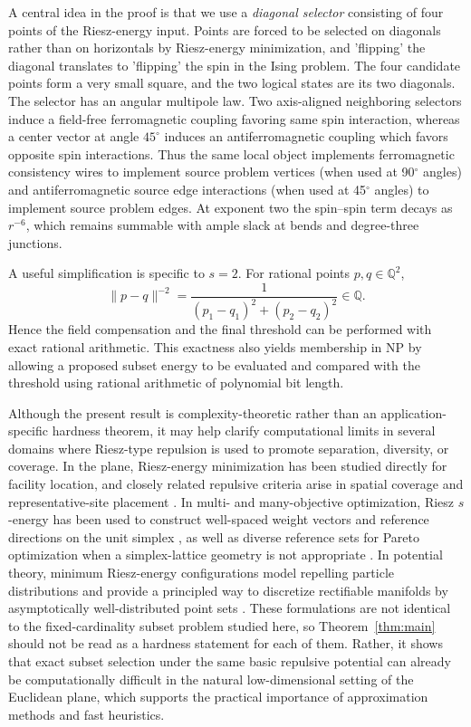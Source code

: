 \documentclass[12pt,a4paper]{article}
\newcommand{\Q}{\mathbb{Q}}
\newcommand{\norm}[1]{\lVert #1\rVert}
\begin{document}
A central idea in the proof is that we use a \emph{diagonal selector} consisting of four points of the Riesz-energy input. Points are forced to be selected on diagonals rather than on horizontals by Riesz-energy minimization, and 'flipping' the diagonal translates to 'flipping' the spin in the Ising problem. The four candidate points form a very small square, and the two logical states are its two diagonals.  The selector has an angular multipole law.  Two axis-aligned neighboring selectors induce a field-free ferromagnetic coupling favoring same spin interaction, whereas a center vector at angle $45^\circ$ induces an antiferromagnetic coupling which favors opposite spin interactions.  Thus the same local object implements ferromagnetic consistency wires to implement source problem vertices (when used at 90$^\circ$ angles) and antiferromagnetic source edge interactions (when used at 45$^\circ$ angles) to implement source problem edges.  At exponent two the spin--spin term decays as $r^{-6}$, which remains summable with ample slack at bends and degree-three junctions.





A useful simplification is specific to $s=2$.  For rational points $p,q\in\Q^2$,
\[
 \norm{p-q}^{-2}=\frac1{(p_1-q_1)^2+(p_2-q_2)^2}\in\Q.
\]
Hence the field compensation and the final threshold can be performed with exact rational arithmetic.  This exactness also yields membership in NP by allowing a proposed subset energy to be evaluated and compared with the threshold using rational arithmetic of polynomial bit length.

Although the present result is complexity-theoretic rather than an application-specific hardness theorem, it may help clarify computational limits in several domains where Riesz-type repulsion is used to promote separation, diversity, or coverage.  In the plane, Riesz-energy minimization has been studied directly for facility location, and closely related repulsive criteria arise in spatial coverage and representative-site placement \cite{Atta2026}.  In multi- and many-objective optimization, Riesz $s$-energy has been used to construct well-spaced weight vectors and reference directions on the unit simplex \cite{BlankDebDhebarBandaruSeada2021}, as well as diverse reference sets for Pareto optimization when a simplex-lattice geometry is not appropriate \cite{FalconCardonaIshibuchiCoello2020}.  In potential theory, minimum Riesz-energy configurations model repelling particle distributions and provide a principled way to discretize rectifiable manifolds by asymptotically well-distributed point sets \cite{HardinSaff2005,HardinSaff2004}.  These formulations are not identical to the fixed-cardinality subset problem studied here, so Theorem~\ref{thm:main} should not be read as a hardness statement for each of them.  Rather, it shows that exact subset selection under the same basic repulsive potential can already be computationally difficult in the natural low-dimensional setting of the Euclidean plane, which supports the practical importance of approximation methods and fast heuristics.
\end{document}
